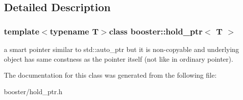 \subsection{\-Detailed \-Description}
\subsubsection*{template$<$typename \-T$>$class booster\-::hold\-\_\-ptr$<$ T $>$}

a smart pointer similar to std\-::auto\-\_\-ptr but it is non-\/copyable and underlying object has same constness as the pointer itself (not like in ordinary pointer). 

\-The documentation for this class was generated from the following file\-:\begin{DoxyCompactItemize}
\item 
booster/hold\-\_\-ptr.\-h\end{DoxyCompactItemize}
